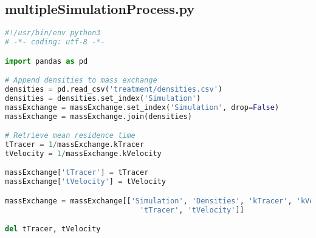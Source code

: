 \subsection{multipleSimulationProcess.py}
\begin{lstlisting}[language=python]
#!/usr/bin/env python3
# -*- coding: utf-8 -*-

import pandas as pd

# Append densities to mass exchange
densities = pd.read_csv('treatment/densities.csv')
densities = densities.set_index('Simulation')
massExchange = massExchange.set_index('Simulation', drop=False)
massExchange = massExchange.join(densities)

# Retrieve mean residence time
tTracer = 1/massExchange.kTracer
tVelocity = 1/massExchange.kVelocity

massExchange['tTracer'] = tTracer
massExchange['tVelocity'] = tVelocity

massExchange = massExchange[['Simulation', 'Densities', 'kTracer', 'kVelocity',
                               'tTracer', 'tVelocity']]

del tTracer, tVelocity
\end{lstlisting}
